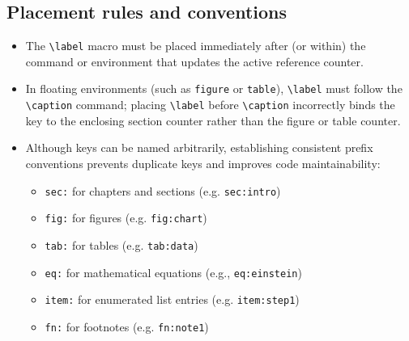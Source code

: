	\subsection{Placement rules and conventions}
		\begin{itemize}
			\item The \lstinline|\label| macro must be placed immediately after (or within) the command or environment that updates the active reference counter.
			\item In floating environments (such as \verb|figure| or \verb|table|), \lstinline|\label| must follow the \lstinline|\caption| command; placing \lstinline|\label| before \lstinline|\caption| incorrectly binds the key to the enclosing section counter rather than the figure or table counter.
			\item Although keys can be named arbitrarily, establishing consistent prefix conventions prevents duplicate keys and improves code maintainability:
			\begin{itemize}
				\item \verb|sec:| for chapters and sections (e.g. \verb|sec:intro|)
				\item \verb|fig:| for figures (e.g. \verb|fig:chart|)
				\item \verb|tab:| for tables (e.g. \verb|tab:data|)
				\item \verb|eq:| for mathematical equations (e.g., \verb|eq:einstein|)
				\item \verb|item:| for enumerated list entries (e.g. \verb|item:step1|)
				\item \verb|fn:| for footnotes (e.g. \verb|fn:note1|)
			\end{itemize}
		\end{itemize}